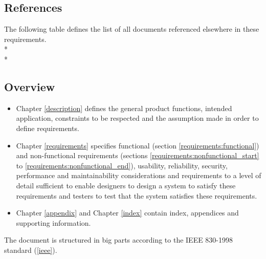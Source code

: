 \subsection{References}
\label{intro:references}
The following table defines the list of all documents referenced elsewhere in these requirements.
\\*
\\*
\begin{reference_table}
\end{reference_table}


\subsection{Overview}
\label{intro:overview}
\begin{itemize}
  \item Chapter \ref{description} defines the general product functions, intended application, constraints to be respected and the assumption made in order to define requirements.
  \item Chapter \ref{requirements} specifies functional (section \ref{requirements:functional}) and non-functional requirements (sections \ref{requirements:nonfunctional_start} to \ref{requirements:nonfunctional_end}), usability, reliability, security, performance and maintainability considerations and requirements to a level of detail sufficient to enable designers to design a system to satisfy these requirements and testers to test that the system satisfies these requirements. %
  \item Chapter \ref{appendix} and Chapter \ref{index} contain index, appendices and supporting information.
\end{itemize}
The document is structured in big parts according to the IEEE 830-1998 standard (\ref{ieee}).
